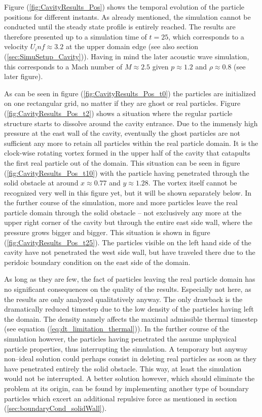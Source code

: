 \documentclass[11pt,a4paper,twoside]{report}
\begin{document}
Figure (\ref{fig:CavityResults_Pos}) shows the temporal evolution of the particle positions for different instants. As already mentioned, the simulation cannot be conducted until the steady state profile is entirely reached. The results are therefore presented up to a simulation time of $t=25$, which corresponds to a velocity $U_inf\approx3.2 $ at the upper domain edge (see also section (\ref{sec:SimuSetup_Cavity})). Having in mind the later acoustic wave simulation, this corresponds to a Mach number of $M\approx 2.5$ given $p\approx1.2$ and $\rho \approx0.8$ (see later figure).

As can be seen in figure (\ref{fig:CavityResults_Pos_t0}) the particles are initialized on one rectangular grid, no matter if they are ghost or real particles. Figure (\ref{fig:CavityResults_Pos_t2}) shows a situation where the regular particle structure starts to dissolve around the cavity entrance. 
Due to the immensly high pressure at the east wall of the cavity, eventually the ghost particles are not sufficient any more to retain all particles within the real particle domain. It is the clock-wise rotating vortex formed in the upper half of the cavity that catapults the first real particle out of the domain. This situation can be seen in figure (\ref{fig:CavityResults_Pos_t10}) with the particle having penetrated through the solid obstacle at around $x\approx0.77$ and $y\approx1.28$. The vortex itself cannot be recognized very well in this figure yet, but it will be shown separately below. In the further course of the simulation, more and more particles leave the real particle domain through the solid obstacle -- not exclusively any more at the upper right corner of the cavity but through the entire east side wall, where the pressure grows bigger and bigger. This situation is shown in figure (\ref{fig:CavityResults_Pos_t25}). The particles visible on the left hand side of the cavity have not penetrated the west side wall, but have traveled there due to the peridoic boundary condition on the east side of the domain.

As long as they are few, the fact of particles leaving the real particle domain has no significant consequences on the quality of the results. Especially not here, as the results are only analyzed qualitatively anyway. The only drawback is the dramatically reduced timestep due to the low density of the particles having left the domain. The density namely affects the maximal admissible thermal timestep (see equation (\ref{eq:dt_limitation_thermal})). In the further course of the simulation however, the particles having penetrated the assume unphysical particle properties, thus interrupting the simulation. A temporary but anyway non--ideal solution could perhaps consist in deleting real particles as soon as they have penetrated entirely the solid obstacle. This way, at least the simulation would not be interrupted. A better solution however, which should eliminate the problem at its origin, can be found by implementing another type of boundary particles which excert an additional repulsive force as mentioned in section (\ref{sec:boundaryCond_solidWall}).
\end{document}
